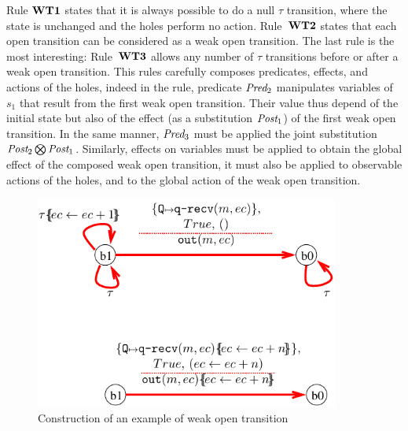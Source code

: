 \documentclass{lmcs}
\begin{document}
Rule $\textbf{WT1}$ states that it is always possible to do a null $\tau$ transition, where the state is unchanged and the holes perform no action. Rule~$\textbf{WT2}$ states that each open transition can be considered as a weak open transition. The last rule is the most interesting:  Rule~$\textbf{WT3}$ allows any number of $\tau$ transitions before or after a weak open transition. This rules carefully composes predicates, effects, and actions of the holes, indeed in the rule, predicate $\Pred_2$ manipulates variables of $s_1$ that result from the first weak open transition. Their value thus depend of the initial state but also of the effect (as a substitution $\Post_1$) of the first weak open transition. In the same manner, $\Pred_3$ must be applied the joint substitution $\Post_2\bigotimes\Post_1$. Similarly, effects on variables must be applied to obtain the global effect of the composed weak open transition, it must also be applied to observable actions of the holes, and to the global action of the weak open transition.



\begin{figure}[ht]
   \centerline{\includegraphics[width=10cm]{XFIG/WOT2-result}}
  \caption{Construction of an example of weak open transition}
   \label{WOT2}
\end{figure}
\end{document}
